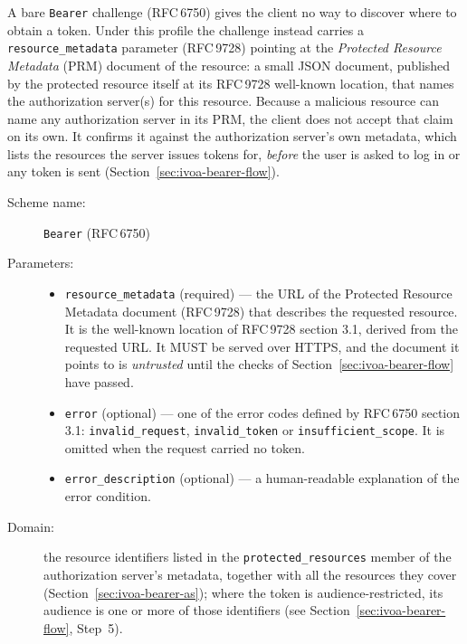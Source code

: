 \documentclass[11pt,a4paper]{ivoa}
\newcommand{\rfc}[1]{RFC\,#1}
\begin{document}
A bare \verb|Bearer| challenge (\rfc{6750}) gives the client no way to discover
where to obtain a token. Under this profile the challenge instead carries a
\verb|resource_metadata| parameter (\rfc{9728}) pointing at the
\emph{Protected Resource Metadata} (PRM) document of the resource: a small JSON
document, published by the protected resource itself at its \rfc{9728}
well-known location, that names the authorization server(s) for this resource.
Because a malicious resource can name any authorization server in its PRM,
the client does not accept that claim on its own. It confirms it against the
authorization server's own metadata, which lists the resources the server
issues tokens for, \emph{before} the user is asked to log in or any token is
sent (Section~\ref{sec:ivoa-bearer-flow}).

\begin{description}
  \item[Scheme name:] \verb|Bearer| (\rfc{6750})
  \item[Parameters:] \mbox{}
  \begin{itemize}
    \item \verb|resource_metadata| (required) --- the URL of the Protected
          Resource Metadata document (\rfc{9728}) that describes the
          requested resource. It is the well-known location of
          \rfc{9728} section 3.1, derived from the requested URL.
          It MUST be served over HTTPS, and the document it points to is
          \emph{untrusted} until the checks of
          Section~\ref{sec:ivoa-bearer-flow} have passed.
    \item \verb|error| (optional) --- one of the error codes defined by
          \rfc{6750} section 3.1: \verb|invalid_request|,
          \verb|invalid_token| or \verb|insufficient_scope|. It is omitted
          when the request carried no token.
    \item \verb|error_description| (optional) --- a human-readable explanation
          of the error condition.
  \end{itemize}
  \item[Domain:] the resource identifiers listed in the
        \verb|protected_resources| member of the authorization server's
        metadata, together with all the resources they cover
        (Section~\ref{sec:ivoa-bearer-as}); where the token is
        audience-restricted, its audience is one or more of those identifiers
        (see Section~\ref{sec:ivoa-bearer-flow}, Step~5).
\end{description}
\end{document}
